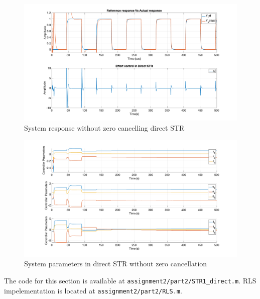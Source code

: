 \begin{figure}
	\centering
	\includegraphics[width=\textwidth]{images/str31.png}
	\caption{System response without zero cancelling direct STR }
	\label{fig:str31}
\end{figure}

\begin{figure}
	\centering
	\includegraphics[width=\textwidth]{images/str32.png}
	\caption{System parameters in direct STR without zero cancellation}
	\label{fig:str32}
\end{figure}

The code  for this section is available at \lstinline|assignment2/part2/STR1_direct.m|. RLS impelementation is located at \lstinline|assignment2/part2/RLS.m|.
